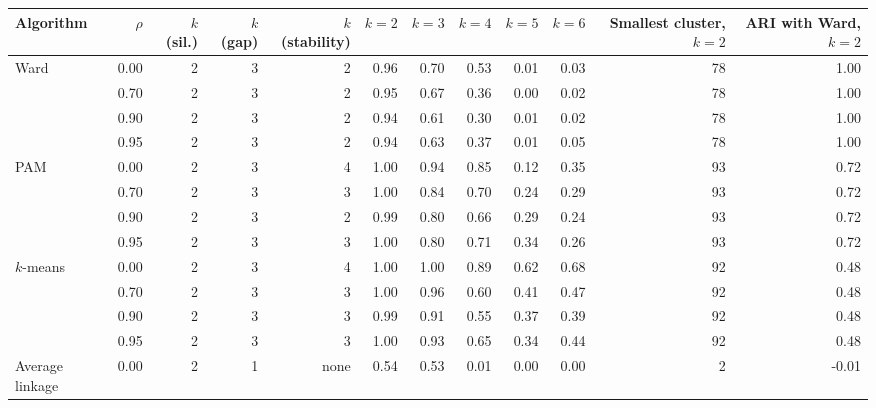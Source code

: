 \begin{tabular}{lrrrrrrrrrrr}
\toprule
Algorithm & $\rho$ & $k$ (sil.) & $k$ (gap) & $k$ (stability) & $k = 2$ & $k = 3$ & $k = 4$ & $k = 5$ & $k = 6$ & Smallest cluster, $k = 2$ & ARI with Ward, $k = 2$ \\
\midrule
Ward & 0.00 & 2 & 3 & 2 & 0.96 & 0.70 & 0.53 & 0.01 & 0.03 & 78 & 1.00 \\
 & 0.70 & 2 & 3 & 2 & 0.95 & 0.67 & 0.36 & 0.00 & 0.02 & 78 & 1.00 \\
 & 0.90 & 2 & 3 & 2 & 0.94 & 0.61 & 0.30 & 0.01 & 0.02 & 78 & 1.00 \\
 & 0.95 & 2 & 3 & 2 & 0.94 & 0.63 & 0.37 & 0.01 & 0.05 & 78 & 1.00 \\
PAM & 0.00 & 2 & 3 & 4 & 1.00 & 0.94 & 0.85 & 0.12 & 0.35 & 93 & 0.72 \\
 & 0.70 & 2 & 3 & 3 & 1.00 & 0.84 & 0.70 & 0.24 & 0.29 & 93 & 0.72 \\
 & 0.90 & 2 & 3 & 2 & 0.99 & 0.80 & 0.66 & 0.29 & 0.24 & 93 & 0.72 \\
 & 0.95 & 2 & 3 & 3 & 1.00 & 0.80 & 0.71 & 0.34 & 0.26 & 93 & 0.72 \\
$k$-means & 0.00 & 2 & 3 & 4 & 1.00 & 1.00 & 0.89 & 0.62 & 0.68 & 92 & 0.48 \\
 & 0.70 & 2 & 3 & 3 & 1.00 & 0.96 & 0.60 & 0.41 & 0.47 & 92 & 0.48 \\
 & 0.90 & 2 & 3 & 3 & 0.99 & 0.91 & 0.55 & 0.37 & 0.39 & 92 & 0.48 \\
 & 0.95 & 2 & 3 & 3 & 1.00 & 0.93 & 0.65 & 0.34 & 0.44 & 92 & 0.48 \\
Average linkage & 0.00 & 2 & 1 & none & 0.54 & 0.53 & 0.01 & 0.00 & 0.00 &  2 & -0.01 \\
\bottomrule
\end{tabular}
